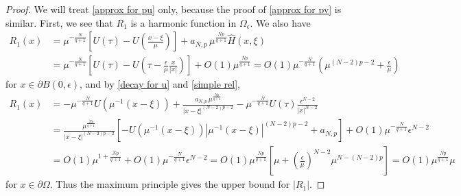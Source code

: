 \documentclass[reqno]{amsart}
\theoremstyle{remark}
\newcommand{\pa}{\partial}
\newcommand{\ep}{\epsilon}
\newcommand{\ga}{\gamma}
\newcommand{\whh}{\widehat{H}}
\renewcommand{\(}{\left(}
\renewcommand{\)}{\right)}
\numberwithin{equation}{section}
\begin{document}
\begin{proof}
We will treat \eqref{approx for pu} only, because the proof of \eqref{approx for pv} is similar. First, we see that $R_1$ is a harmonic function in $\Omega_\ep$. We also have
\begin{align*}
R_1(x)&=\mu^{-\frac{N}{q+1}} \left[U(\tau)-U\(\frac{x-\xi}{\mu}\)\right] + a_{N,p}\, \mu^{\frac{Np}{q+1}}\whh(x,\xi) \\
&=\mu^{-\frac{N}{q+1}} \left[U(\tau)-U\(\tau-\frac{\ep}{\mu}\frac{x}{|x|}\)\right] + O(1)\mu^{\frac{Np}{q+1}}
= O(1)\mu^{-\frac{N}{q+1}}\(\mu^{(N-2)p-2}+\frac{\ep}{\mu}\)
\end{align*}
for $x \in \pa B(0,\ep)$, and by \eqref{decay for u} and \eqref{simple rel},
\begin{align*}
R_1(x)&=-\mu^{-\frac{N}{q+1}}U (\mu^{-1}(x-\xi))+\frac{a_{N,p}\, \mu^{\frac{Np}{q+1}}}{|x-\xi|^{(N-2)p-2}} - \mu^{-\frac{N}{q+1}}U(\tau)\frac{\ep^{N-2}}{|x|^{N-2}}\\
&=\frac{\mu^{\frac{Np}{q+1}}}{|x-\xi|^{(N-2)p-2}} \left[-U\(\mu^{-1}(x-\xi)\) \left|\mu^{-1}(x-\xi)\right|^{(N-2)p-2}+a_{N,p}\right] + O(1)\mu^{-\frac{N}{q+1}}\ep^{N-2}\\
&= O(1)\mu^{1+\frac{Np}{q+1}} + O(1)\mu^{-\frac{N}{q+1}}\ep^{N-2} = O(1) \mu^{\frac{Np}{q+1}} \left[\mu+\(\frac{\ep}{\mu}\)^{N-2}\mu^{N-(N-2)p}\right] = O(1) \mu^{\frac{Np}{q+1}} \mu
\end{align*}
for $x \in \pa \Omega$. Thus the maximum principle gives the upper bound for $|R_1|$.
%
\end{proof}
\end{document}
